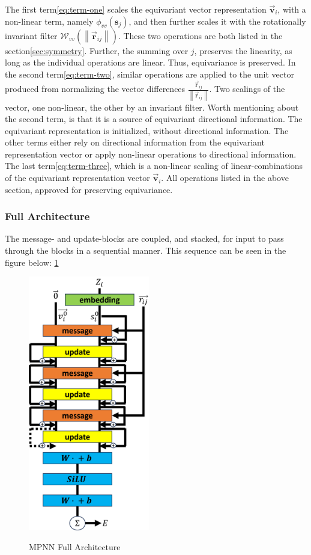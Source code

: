 The first term\ref{eq:term-one} scales the equivariant vector representation $\vec{\mathbf{v}}_{i}$, with a non-linear term, namely $\phi_{vv}(\mathbf{s}_{j})$, and
then further scales it with the rotationally invariant filter $\mathcal{W}_{vv}(\left \| \vec{\mathbf{r}}_{ij} \right \|)$. These two operations
are both listed in the section\ref{sec:symmetry}. Further, the summing over $j$, preserves the linearity, as long as the individual operations
are linear. Thus, equivariance is preserved. In the second term\ref{eq:term-two}, similar operations are applied to the unit vector produced from normalizing the
vector differences $\frac{\vec{\mathbf{r}}_{ij}}{\left \|\vec{\mathbf{r}}_{ij} \right \|}$. Two scalings of the vector, one non-linear, the other
by an invariant filter. Worth mentioning about the second term, is that it is a source of equivariant directional information.
The equivariant representation is
initialized, without directional information. The other terms either rely on directional information from the equivariant representation vector
or apply non-linear operations to directional information. The last term\ref{eq:term-three}, which is a non-linear scaling of linear-combinations
of the equivariant representation vector $\vec{\mathbf{v}}_{i}$. All operations listed in the above section, approved for preserving equivariance.

\subsubsection{Full Architecture}

The message- and update-blocks are coupled, and stacked, for input to pass through the blocks in a sequential manner. This sequence can be
seen in the figure below: \ref{img:MPNN_arc}


\begin{figure}[H]
    \caption{MPNN Full Architecture}
    \centering\label{img:MPNN_arc}
    \includegraphics[width=150pt]{Images/Method/MPNN_arc.png}
\end{figure}

